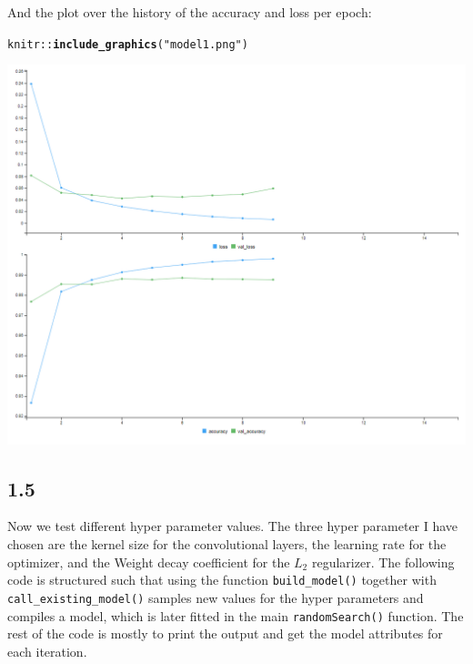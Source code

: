 \documentclass[10pt, a4paper, english]{article}\usepackage[]{graphicx}\usepackage[dvipsnames]{xcolor}
\makeatletter
\def\maxwidth{ %
  \ifdim\Gin@nat@width>\linewidth
    \linewidth
  \else
    \Gin@nat@width
  \fi
}
\newcommand{\hlstr}[1]{\textcolor[rgb]{0.192,0.494,0.8}{#1}}%
\newcommand{\hlopt}[1]{\textcolor[rgb]{0,0,0}{#1}}%
\newcommand{\hlstd}[1]{\textcolor[rgb]{0.345,0.345,0.345}{#1}}%
\newcommand{\hlkwd}[1]{\textcolor[rgb]{0.737,0.353,0.396}{\textbf{#1}}}%
\newenvironment{kframe}{%
 \def\at@end@of@kframe{}%
 \ifinner\ifhmode%
  \def\at@end@of@kframe{\end{minipage}}%
  \begin{minipage}{\columnwidth}%
 \fi\fi%
 \def\FrameCommand##1{\hskip\@totalleftmargin \hskip-\fboxsep
 \colorbox{shadecolor}{##1}\hskip-\fboxsep
     \hskip-\linewidth \hskip-\@totalleftmargin \hskip\columnwidth}%
 \MakeFramed {\advance\hsize-\width
   \@totalleftmargin\z@ \linewidth\hsize
   \@setminipage}}%
 {\par\unskip\endMakeFramed%
 \at@end@of@kframe}
\newenvironment{knitrout}{}{} %
\makeatother
\begin{document}
And the plot over the history of the accuracy and loss per epoch:
\begin{knitrout}
\color{fgcolor}\begin{kframe}
\begin{alltt}
\hlstd{knitr}\hlopt{::}\hlkwd{include_graphics}\hlstd{(}\hlstr{"model1.png"}\hlstd{)}
\end{alltt}
\end{kframe}
\includegraphics[width=\maxwidth]{model1} 
\end{knitrout}
\subsection{1.5}
Now we test different hyper parameter values. The three hyper parameter I have chosen are the kernel size for the convolutional layers, the learning rate for the optimizer,  and the Weight decay coefficient for the $L_2$ regularizer. The following code is structured such that using the function \texttt{build\_model()} together with \texttt{call\_existing\_model()} samples new values for the hyper parameters and compiles a model, which is later fitted in the main \texttt{randomSearch()} function. The rest of the code is mostly to print the output and get the model attributes for each iteration.
\end{document}
